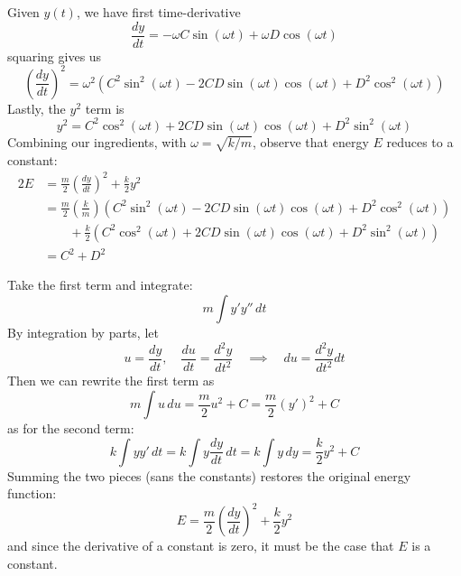 \documentclass[a4paper]{article}
\begin{document}

Given \(y \!\left( t \right) \), we have first time-derivative
\[
	\frac{d y}{d t} = - \omega C \sin\left( \omega t \right) + \omega D \cos\left( \omega t \right)
\]
squaring gives us
\[
	\!\left( \frac{d y}{d t}  \right)^{2} = \omega^{2} \!\left( C^{2} \sin^{2}\left( \omega t \right) - 2 CD \sin\left( \omega t \right) \cos\left( \omega t \right) + D^{2}\cos^{2}\left( \omega t \right) \right)
\]
Lastly, the \(y^{2}\) term is
\[
	y^{2} = C^{2} \cos^{2}\left( \omega t \right) + 2CD \sin\left( \omega t \right)\cos\left( \omega t \right) + D^{2}\sin^{2}\left( \omega t \right)
\]
Combining our ingredients, with \(\omega = \sqrt{k / m}\), observe that energy \(E\) reduces to a constant:
\begin{alignat*}{2}
	E & = \frac{m}{2} \!\left( \frac{d y}{d t}  \right)^{2} + \frac{k}{2} y^{2} \\
	  & = \frac{m}{2} \!\left( \frac{k}{m} \right) \!\left( C^{2}\sin^{2}\left( \omega t \right) - 2CD \sin\left( \omega t \right) \cos\left( \omega t \right) + D^{2} \cos^{2}\left( \omega t \right)\right)  \\ 
	  & \qquad + \frac{k}{2} \!\left( C^{2} \cos^{2}\left( \omega t \right) + 2CD \sin\left( \omega t \right)\cos\left( \omega t \right) + D^{2}\sin^{2}\left( \omega t \right) \right) \\
	  & = C^{2} + D^{2}
\end{alignat*}

\newpage


Take the first term and integrate:
\[
	m \int y'y'' \, dt
\]
By integration by parts, let
\[
	u = \frac{d y}{d t}, \quad \frac{d u}{d t} = \frac{d^{2}y}{d t^{2}} \quad \implies \quad du = \frac{d^{2}y}{d t^{2}} dt 
\]
Then we can rewrite the first term as
\[
	m \int u \, du = \frac{m}{2}u^{2} + C = \frac{m}{2} \!\left( y' \right)^{2} + C 
\]
as for the second term:
\[
	k \int yy' \, dt = k \int y \frac{d y}{d t}  \, dt = k \int y \, dy = \frac{k}{2}y^{2} + C 
\]
Summing the two pieces (sans the constants) restores the original energy function:
\[
	E = \frac{m}{2} \!\left( \frac{d y}{d t}  \right)^{2} + \frac{k}{2}y^{2}
\]
and since the derivative of a constant is zero, it must be the case that \(E\) is a constant.
\end{document}
